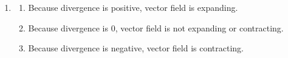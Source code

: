 \documentclass[12pt]{article}
\begin{document}
\begin{enumerate}
\begin{enumerate}
\begin{enumerate}
		\end{enumerate}

		\item [c.]
		\begin{enumerate}
			\item [i.]
			Because divergence is positive, vector field is expanding.

			\item [ii.]
			Because divergence is 0, vector field is not expanding or  contracting.

			\item [iii.]
			Because divergence is negative, vector field is contracting.

		\end{enumerate}


	\end{enumerate}



\end{enumerate}
\end{document}
